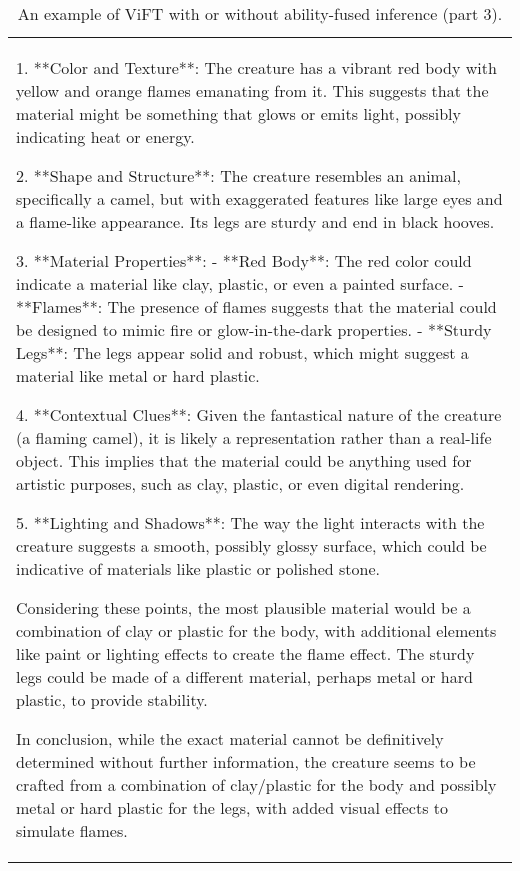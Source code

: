 \begin{table*}[htbp]
\begin{tabular}{p{14cm}}
\begin{tcolorbox}[colback=gray!5, colframe=gray!40, sharp corners, width=\linewidth, boxrule=0.5mm]
1. **Color and Texture**: The creature has a vibrant red body with yellow and orange flames emanating from it. This suggests that the material might be something that glows or emits light, possibly indicating heat or energy.

2. **Shape and Structure**: The creature resembles an animal, specifically a camel, but with exaggerated features like large eyes and a flame-like appearance. Its legs are sturdy and end in black hooves.

3. **Material Properties**:
   - **Red Body**: The red color could indicate a material like clay, plastic, or even a painted surface.
   - **Flames**: The presence of flames suggests that the material could be designed to mimic fire or glow-in-the-dark properties.
   - **Sturdy Legs**: The legs appear solid and robust, which might suggest a material like metal or hard plastic.

4. **Contextual Clues**: Given the fantastical nature of the creature (a flaming camel), it is likely a representation rather than a real-life object. This implies that the material could be anything used for artistic purposes, such as clay, plastic, or even digital rendering.

5. **Lighting and Shadows**: The way the light interacts with the creature suggests a smooth, possibly glossy surface, which could be indicative of materials like plastic or polished stone.

Considering these points, the most plausible material would be a combination of clay or plastic for the body, with additional elements like paint or lighting effects to create the flame effect. The sturdy legs could be made of a different material, perhaps metal or hard plastic, to provide stability.

In conclusion, while the exact material cannot be definitively determined without further information, the creature seems to be crafted from a combination of clay/plastic for the body and possibly metal or hard plastic for the legs, with added visual effects to simulate flames.


\end{tcolorbox}
\end{tabular}
\caption{An example of ViFT with or without ability-fused inference (part 3).}
\label{tab:case2}
\end{table*}



